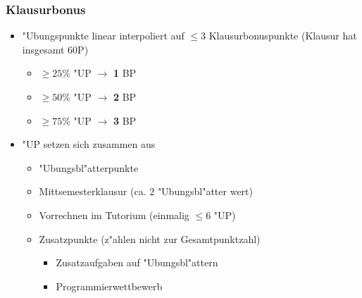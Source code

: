\begin{frame}
  \frametitle{Klausurbonus}
  \begin{itemize}
    \item "Ubungspunkte linear interpoliert auf $\leq 3$ Klausurbonuspunkte
          (Klausur hat insgesamt 60P)
      \begin{itemize}
      \item $\geq 25$\% "UP $\rightarrow$ \textbf{1} BP
      \item $\geq 50$\%  "UP $\rightarrow$ \textbf{2} BP
      \item $\geq 75$\% "UP $\rightarrow$ \textbf{3} BP
      \end{itemize}
    \item "UP setzen sich zusammen aus
      \begin{itemize}
      \item "Ubungsbl"atterpunkte
      \item Mittsemesterklausur (ca. 2 "Ubungsbl"atter wert)
      \item Vorrechnen im Tutorium (einmalig $\leq 6$ "UP)
      \item Zusatzpunkte (z"ahlen nicht zur Gesamtpunktzahl)
        \begin{itemize}
        \item Zusatzaufgaben auf "Ubungsbl"attern
        \item Programmierwettbewerb
        \end{itemize}
      \end{itemize}
  \end{itemize}
\end{frame}

